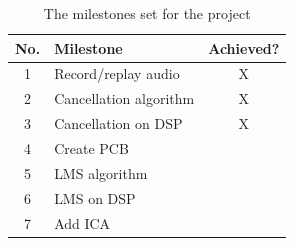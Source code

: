 \begin{table}[H]
	\centering
	\begin{tabular}[c]{| c | l | c |}
		\hline
		No.	& Milestone		& Achieved? \\
		\hline
		1	& Record/replay audio	& X \\
		2	& Cancellation algorithm & X \\
		3	& Cancellation on DSP	& X \\
		4	& Create PCB		& \\
		5	& LMS algorithm		& \\
		6	& LMS on DSP		& \\
		7	& Add ICA		& \\
		\hline
	\end{tabular}
	\caption{The milestones set for the project}
	\label{tab:milestones}
\end{table}
